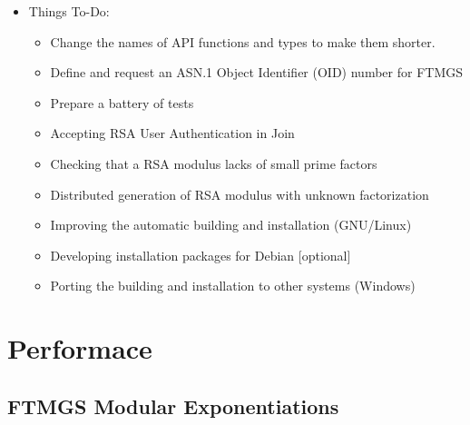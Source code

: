 \documentclass[a4paper]{article}
\begin{document}
\begin{itemize}
\item Things To-Do:
\begin{itemize}%
\item Change the names of API functions and types to make them shorter.
\item Define and request an ASN.1 Object Identifier (OID) number for FTMGS
\item Prepare a battery of tests
\item Accepting RSA User Authentication in Join
\item Checking that a RSA modulus lacks of small prime factors
\item Distributed generation of RSA modulus with unknown factorization
\item Improving the automatic building and installation (GNU/Linux)
\item Developing installation packages for Debian [optional]
\item Porting the building and installation to other systems (Windows)
\end{itemize}%
\end{itemize}%

\section{Performace}

\subsection*{FTMGS Modular Exponentiations}
\end{document}
